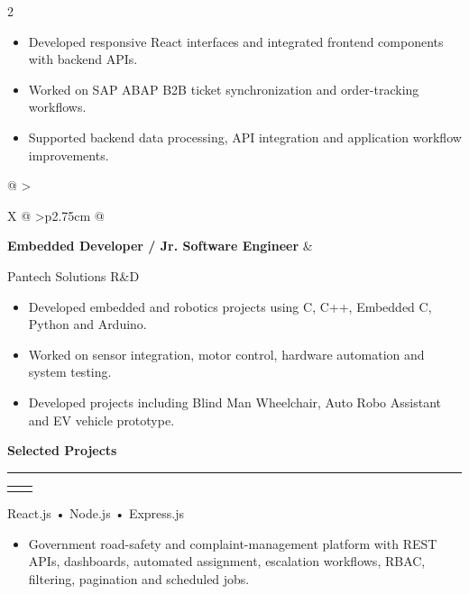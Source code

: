 ﻿\documentclass[10pt,a4paper]{article}
\makeatletter
\newcommand{\cvsection}[1]{%
    \vspace{3pt}
    {\large\bfseries\textcolor{darkcol}{#1}}
    \par
    \vspace{2pt}
    {\color{accentcol}\rule{\linewidth}{1.1pt}}
    \vspace{3pt}
}
\newcommand{\datebox}[1]{%
    \colorbox{accentcol}{%
        \makebox[2.75cm][c]{%
            \textcolor{white}{\scriptsize\bfseries #1}
        }%
    }%
}
\newcommand{\event}[4]{%

    \vspace{1pt}

    \noindent
    \begin{tabularx}{\linewidth}{
        @{}
        >{\raggedright\arraybackslash}X
        @{\hspace{5pt}}
        >{\raggedleft\arraybackslash}p{2.75cm}
        @{}
    }
        {\small\bfseries\textcolor{darkcol}{#2}}
        &
        \datebox{#1}
    \end{tabularx}

    \vspace{1pt}

    {\small\textcolor{lightcol}{#3}}

    \vspace{1pt}

    #4

    \vspace{2pt}
}
\makeatother
\begin{document}
\begin{paracol}{2}
{\begin{itemize}
\item {\small
Developed responsive React interfaces and integrated frontend
components with backend APIs.
}

\item {\small
Worked on SAP ABAP B2B ticket synchronization and
order-tracking workflows.
}

\item {\small
Supported backend data processing, API integration and
application workflow improvements.
}

\end{itemize}
}


\event
{Dec 2021 -- Mar 2023}
{Embedded Developer / Jr. Software Engineer}
{Pantech Solutions R\&D}
{
\begin{itemize}

\item {\small
Developed embedded and robotics projects using C, C++,
Embedded C, Python and Arduino.
}

\item {\small
Worked on sensor integration, motor control, hardware
automation and system testing.
}

\item {\small
Developed projects including Blind Man Wheelchair,
Auto Robo Assistant and EV vehicle prototype.
}

\end{itemize}
}


\cvsection{Selected Projects}


\event
{2024 -- Present}
{GujMarg -- Road Safety Portal}
{React.js • Node.js • Express.js}
{
\begin{itemize}

\item {\small
Government road-safety and complaint-management platform with
REST APIs, dashboards, automated assignment, escalation
workflows, RBAC, filtering, pagination and scheduled jobs.
}

\end{itemize}
}


\end{paracol}
\end{document}
